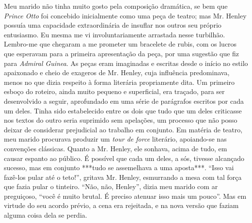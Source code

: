Meu marido não tinha muito gosto pela composição dramática, se bem que
\textit{Prince Otto} foi concebido inicialmente como uma peça de
teatro; mas Mr. Henley possuía uma capacidade extraordinária de
insuflar nos outros seu próprio entusiasmo.  Eu mesma me vi
involuntariamente arrastada nesse turbilhão.  Lembro-me que chegaram a
me prometer um bracelete de rubis, com os lucros que esperavam para a
primeira apresentação da peça, por uma sugestão que fiz para
\textit{Admiral Guinea}.  As peças eram imaginadas e escritas desde o
início no estilo apaixonado e cheio de exageros de Mr. Henley, cuja
influência predominava, menos no que dizia respeito à forma literária
propriamente dita.  Um primeiro esboço do roteiro, ainda muito pequeno
e superficial, era traçado, para ser desenvolvido a seguir, aprofundado
em uma série de parágrafos escritos por cada um deles.  Tinha sido
estabelecido entre os dois que tudo que um deles criticasse nos textos
do outro seria suprimido sem apelações, um processo que não posso
deixar de considerar prejudicial ao trabalho em conjunto.  Em matéria
de teatro, meu marido procurava produzir um \textit{tour de force}
literário, apoiando-se nas convenções clássicas.  Quanto a Mr. Henley,
ele sonhava, acima de tudo, em causar espanto ao público.  É possível que
cada um deles, a sós, tivesse alcançado sucesso, mas em conjunto
***tudo se assemelhava a uma aposta***. “Isso vai fazê-los pular até o		%
teto!”, gritava Mr. Henley, esmurrando a mesa com tal força que fazia
pular o tinteiro. “Não, não, Henley”, dizia meu marido com ar
preguiçoso, “você é muito brutal. É preciso atenuar isso mais um
pouco”.  Mas em virtude do seu acordo prévio, a cena era rejeitada, e
na nova versão que faziam alguma coisa dela se perdia.


